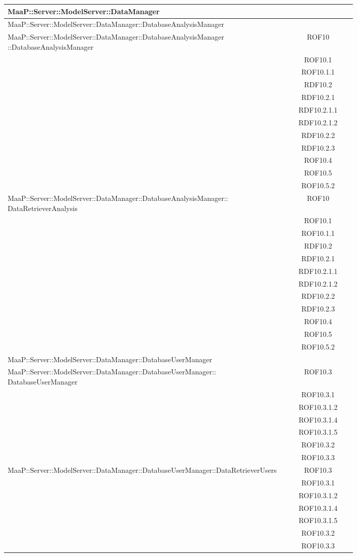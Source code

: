\begin{center}
\begin{longtable}{|p{0.8\linewidth}|c|}
\midrule 
MaaP::Server::ModelServer::DataManager 
& \\

\midrule
MaaP::Server::ModelServer::DataManager::DatabaseAnalysisManager 
& \\

\midrule 
MaaP::Server::ModelServer::DataManager::DatabaseAnalysisManager ::DatabaseAnalysisManager
& ROF10\\
& ROF10.1\\
& ROF10.1.1\\ 
& RDF10.2\\
& RDF10.2.1\\
& RDF10.2.1.1\\
& RDF10.2.1.2\\
& RDF10.2.2\\
& RDF10.2.3\\
& ROF10.4\\
& ROF10.5\\
& ROF10.5.2\\

\midrule
MaaP::Server::ModelServer::DataManager::DatabaseAnalysisManager:: DataRetrieverAnalysis 
& ROF10\\
& ROF10.1\\
& ROF10.1.1\\
& RDF10.2\\
& RDF10.2.1\\
& RDF10.2.1.1\\
& RDF10.2.1.2\\
& RDF10.2.2\\
& RDF10.2.3\\
& ROF10.4\\
& ROF10.5\\
& ROF10.5.2\\

\midrule 
MaaP::Server::ModelServer::DataManager::DatabaseUserManager 
& \\

\midrule 
MaaP::Server::ModelServer::DataManager::DatabaseUserManager:: DatabaseUserManager
& ROF10.3\\
& ROF10.3.1\\
& ROF10.3.1.2\\
& ROF10.3.1.4\\
& ROF10.3.1.5\\
& ROF10.3.2\\
& ROF10.3.3\\


\midrule 
MaaP::Server::ModelServer::DataManager::DatabaseUserManager::DataRetrieverUsers
& ROF10.3\\
& ROF10.3.1\\
& ROF10.3.1.2\\
& ROF10.3.1.4\\
& ROF10.3.1.5\\
& ROF10.3.2\\
& ROF10.3.3\\



\end{longtable}
\end{center}
